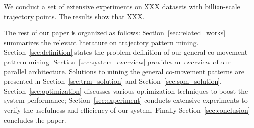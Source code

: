 
We conduct a set of extensive experiments on XXX datasets with billion-scale trajectory points. The results show that XXX.

The rest of our paper is organized as follows: Section~\ref{sec:related_works} summarizes the relevant literature on 
trajectory pattern mining. Section~\ref{sec:definition} states the problem definition of our general co-movement pattern mining. Section~\ref{sec:system_overview} provides an overview of our parallel architecture. Solutions to mining the general co-movement patterns are presented in Section~\ref{sec:trm_solution} and Section~\ref{sec:spm_solution}. Section~\ref{sec:optimization} discusses various optimization techniques to boost the system performance; Section~\ref{sec:experiment} conducts extensive experiments to verify the usefulness and efficiency of our system. Finally Section~\ref{sec:conclusion} concludes the paper.
